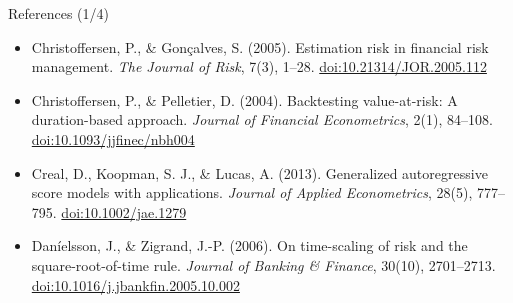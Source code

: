 \begin{frame}{References (1/4)}
\begin{itemize}
    \item Christoffersen, P., \& Gonçalves, S. (2005). Estimation risk in financial risk management. \textit{The Journal of Risk}, 7(3), 1--28. \href{https://doi.org/10.21314/JOR.2005.112}{doi:10.21314/JOR.2005.112}
    \item Christoffersen, P., \& Pelletier, D. (2004). Backtesting value-at-risk: A duration-based approach. \textit{Journal of Financial Econometrics}, 2(1), 84--108. \href{https://doi.org/10.1093/jjfinec/nbh004}{doi:10.1093/jjfinec/nbh004}
    \item Creal, D., Koopman, S. J., \& Lucas, A. (2013). Generalized autoregressive score models with applications. \textit{Journal of Applied Econometrics}, 28(5), 777--795. \href{https://doi.org/10.1002/jae.1279}{doi:10.1002/jae.1279}
    \item Daníelsson, J., \& Zigrand, J.-P. (2006). On time-scaling of risk and the square-root-of-time rule. \textit{Journal of Banking \& Finance}, 30(10), 2701--2713. \href{https://doi.org/10.1016/j.jbankfin.2005.10.002}{doi:10.1016/j.jbankfin.2005.10.002}
\end{itemize}
\end{frame}

